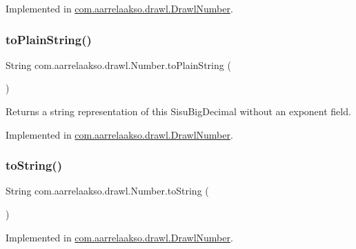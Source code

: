 Implemented in \hyperlink{classcom_1_1aarrelaakso_1_1drawl_1_1_drawl_number_afa8d185aa5f961e7d54e62c96d788660}{com.\+aarrelaakso.\+drawl.\+Drawl\+Number}.

\mbox{\label{interfacecom_1_1aarrelaakso_1_1drawl_1_1_number_a0c6dd9fbd93fdb6d7e487f507d55ba43}} 
\subsubsection{\texorpdfstring{to\+Plain\+String()}{toPlainString()}}
{\footnotesize\ttfamily String com.\+aarrelaakso.\+drawl.\+Number.\+to\+Plain\+String (\begin{DoxyParamCaption}{ }\end{DoxyParamCaption})}

\begin{DoxyReturn}{Returns}
a string representation of this Sisu\+Big\+Decimal without an exponent field. 
\end{DoxyReturn}


Implemented in \hyperlink{classcom_1_1aarrelaakso_1_1drawl_1_1_drawl_number_a07c4c1c3a0e81ae9aef3325bef3e0152}{com.\+aarrelaakso.\+drawl.\+Drawl\+Number}.

\mbox{\label{interfacecom_1_1aarrelaakso_1_1drawl_1_1_number_a9dc0aea5633aebc8f5888b5a194dcd81}} 
\subsubsection{\texorpdfstring{to\+String()}{toString()}}
{\footnotesize\ttfamily String com.\+aarrelaakso.\+drawl.\+Number.\+to\+String (\begin{DoxyParamCaption}{ }\end{DoxyParamCaption})}



Implemented in \hyperlink{classcom_1_1aarrelaakso_1_1drawl_1_1_drawl_number_a24775bf5217d477c4b39149596210184}{com.\+aarrelaakso.\+drawl.\+Drawl\+Number}.


